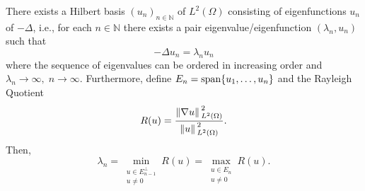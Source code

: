 \begin{theorem}\label{spec_lap_pre}
    There exists a Hilbert basis \((u_n)_{n \in \mathbb{N}}\) of \(L^2(\Omega)\) consisting of eigenfunctions \(u_n\) of \(-\Delta\), i.e., for each \(n \in \mathbb{N}\) there exists a pair eigenvalue/eigenfunction \((\lambda_n, u_n)\) such that
    \[
        -\Delta u_n = \lambda_n u_n
    \]
    where the sequence of eigenvalues can be ordered in increasing order and \(\lambda_n \rightarrow \infty, \; n \rightarrow \infty\). Furthermore, define \(E_n = \operatorname{span}\{u_1, \dots, u_n\}\) and the Rayleigh Quotient
    \[
        R(u) = \frac{\norm*{\nabla u}^2_{L^2(\Omega)}}{\norm*{u}^2_{L^2(\Omega)}}.
    \]
    Then,
    \[
    \lambda_n = \min_{\substack{u \in E^\perp_{n-1} \\ u \neq 0}} R(u) = \max_{\substack{u \in E_n \\ u \neq 0}} R(u).
    \]
\end{theorem}
